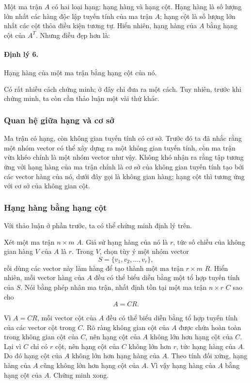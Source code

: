 \documentclass[11pt]{article}
\begin{document}
Một ma trận \(A\) có hai loại hạng: hạng hàng và hạng cột. Hạng hàng là số lượng
lớn nhất các hàng độc lập tuyến tính của ma trận \(A\); hạng cột là số lượng lớn
nhất các cột thỏa điều kiện tương tự. Hiển nhiên, hạng hàng của \(A\) bằng hạng
cột của \(A^T\). Nhưng điều đẹp hơn là:

\paragraph{Định lý 6.}
Hạng hàng của một ma trận bằng hạng cột của nó.

Có rất nhiều cách chứng minh; ở đây chỉ đưa ra một cách. Tuy nhiên, trước khi
chứng minh, ta còn cần thảo luận một vài thứ khác.

\subsubsection{Quan hệ giữa hạng và cơ sở}

Ma trận có hạng, còn không gian tuyến tính có cơ sở. Trước đó ta đã nhắc rằng
một nhóm vector có thể xây dựng ra một không gian tuyến tính, còn ma trận vừa
khéo chính là một nhóm vector như vậy. Không khó nhận ra rằng tập tương ứng với
hạng hàng của ma trận chính là cơ sở của không gian tuyến tính tạo bởi các
vector hàng của nó, dưới đây gọi là không gian hàng; hạng cột thì tương ứng với
cơ sở của không gian cột.

\subsubsection{Hạng hàng bằng hạng cột}

Với thảo luận ở phần trước, ta có thể chứng minh định lý trên.

Xét một ma trận \(n\times m\) \(A\). Giả sử hạng hàng của nó là \(r\), tức số
chiều của không gian hàng \(V\) của \(A\) là \(r\). Trong \(V\), chọn tùy ý một
nhóm vector
\[
  S=\{v_1,v_2,\ldots,v_r\},
\]
rồi dùng các vector này làm hàng để tạo thành một ma trận \(r\times m\) \(R\).
Hiển nhiên, mỗi vector hàng của \(A\) đều có thể biểu diễn bằng một tổ hợp tuyến
tính của \(S\). Nói bằng phép nhân ma trận, nhất định tồn tại một ma trận
\(n\times r\) \(C\) sao cho
\[
  A=CR.
\]

Vì \(A=CR\), mỗi vector cột của \(A\) đều có thể biểu diễn bằng tổ hợp tuyến tính
của các vector cột trong \(C\). Rõ ràng không gian cột của \(A\) được chứa hoàn
toàn trong không gian cột của \(C\), nên hạng cột của \(A\) không lớn hơn hạng
cột của \(C\). Lại vì \(C\) chỉ có \(r\) cột, nên hạng cột của \(C\) không lớn
hơn \(r\), tức hạng hàng của \(A\). Do đó hạng cột của \(A\) không lớn hơn hạng
hàng của \(A\). Theo tính đối xứng, hạng hàng của \(A\) cũng không lớn hơn hạng
cột của \(A\). Vì vậy hạng hàng của \(A\) bằng hạng cột của \(A\). Chứng minh
xong.
\end{document}
